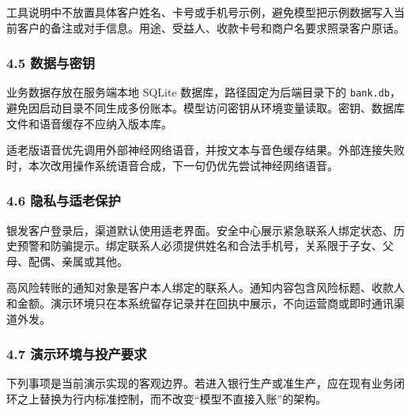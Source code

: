 \documentclass[
  a4paper,
  zihao=5,
  fontset=none]{ctexart}
\begin{document}
工具说明中不放置具体客户姓名、卡号或手机号示例，避免模型把示例数据写入当前客户的备注或对手信息。用途、受益人、收款卡号和商户名要求照录客户原话。

\subsubsection{4.5 数据与密钥}\label{ux6570ux636eux4e0eux5bc6ux94a5}

业务数据存放在服务端本地 SQLite 数据库，路径固定为后端目录下的
\texttt{bank.db}，避免因启动目录不同生成多份账本。模型访问密钥从环境变量读取。密钥、数据库文件和语音缓存不应纳入版本库。

适老版语音优先调用外部神经网络语音，并按文本与音色缓存结果。外部连接失败时，本次改用操作系统语音合成，下一句仍优先尝试神经网络语音。

\subsubsection{4.6
隐私与适老保护}\label{ux9690ux79c1ux4e0eux9002ux8001ux4fddux62a4}

银发客户登录后，渠道默认使用适老界面。安全中心展示紧急联系人绑定状态、历史预警和防骗提示。绑定联系人必须提供姓名和合法手机号，关系限于子女、父母、配偶、亲属或其他。

高风险转账的通知对象是客户本人绑定的联系人。通知内容包含风险标题、收款人和金额。演示环境只在本系统留存记录并在回执中展示，不向运营商或即时通讯渠道外发。

\subsubsection{4.7
演示环境与投产要求}\label{ux6f14ux793aux73afux5883ux4e0eux6295ux4ea7ux8981ux6c42}

下列事项是当前演示实现的客观边界。若进入银行生产或准生产，应在现有业务闭环之上替换为行内标准控制，而不改变``模型不直接入账''的架构。
\end{document}
